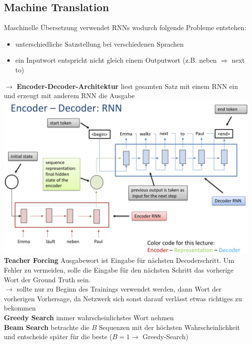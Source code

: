 \documentclass[12pt]{article}
\begin{document}
	\subsection{Machine Translation}
	Maschinelle Übersetzung verwendet RNNs wodurch folgende Probleme entstehen:
	\begin{itemize}
		\item unterschiedliche Satzstellung bei verschiedenen Sprachen
		\item ein Inputwort entspricht nicht gleich einem Outputwort (z.B. neben $\Rightarrow$ next to)
	\end{itemize}
	$\rightarrow$ \textbf{Encoder-Decoder-Architektur} liest gesamten Satz mit einem RNN ein und erzeugt mit anderem RNN die Ausgabe\\
	\includegraphics[width=\linewidth]{figures/encoder-decoder-rnn.png}\\
	\textbf{Teacher Forcing} Ausgabewort ist Eingabe für nächsten Decoderschritt. Um Fehler zu vermeiden, solle die Eingabe für den nächsten Schritt das vorherige Wort der Ground Truth sein.\\
	$\rightarrow$ sollte nur zu Beginn des Trainings verwendet werden, dann Wort der vorherigen Vorhersage, da Netzwerk sich sonst darauf verlässt etwas richtiges zu bekommen\\
	\textbf{Greedy Search} immer wahrscheinlichstes Wort nehmen\\
	\textbf{Beam Search} betrachte die $B$ Sequenzen mit der höchsten Wahrscheinlichkeit und entscheide später für die beste ($B = 1 \rightarrow$ Greedy-Search)\\
\end{document}

